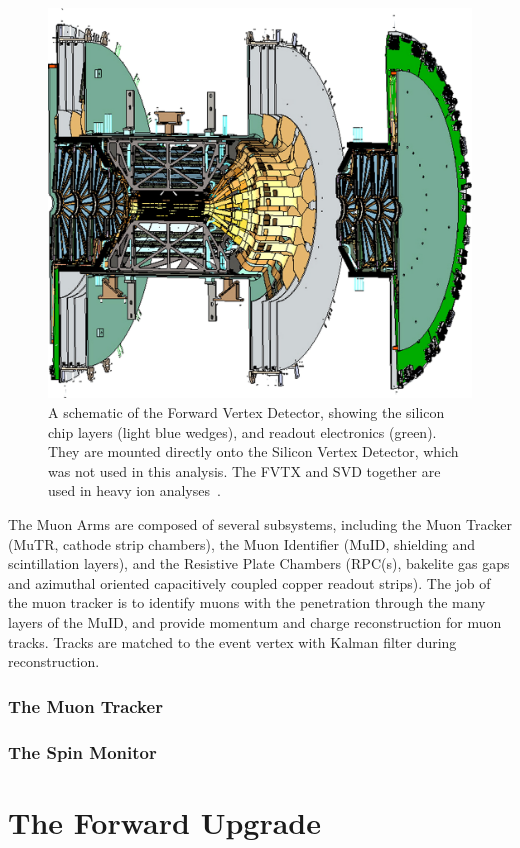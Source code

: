 \begin{figure}[ht]
  \centering
  \includegraphics[width=0.6\linewidth]{./figures/forward_vertex_detector}
  \caption{
    A schematic of the Forward Vertex Detector, showing the silicon chip layers
    (light blue wedges), and readout electronics (green). They are mounted
    directly onto the Silicon Vertex Detector, which was not used in this
    analysis. The FVTX and SVD together are used in heavy ion
    analyses~\cite{Aidala2014}.
  }
  \label{fig:forward_vertex_detector}
\end{figure}

The Muon Arms are composed of several subsystems, including the Muon Tracker
(MuTR, cathode strip chambers), the Muon Identifier (MuID, shielding and
scintillation layers), and the Resistive Plate Chambers (RPC(s), bakelite gas
gaps and azimuthal oriented capacitively coupled copper readout strips). The job
of the muon tracker is to identify muons with the penetration through the many
layers of the MuID, and provide momentum and charge reconstruction for muon
tracks. Tracks are matched to the event vertex with Kalman filter during
reconstruction.

\subsubsection{The Muon Tracker}
\subsubsection{}
\subsubsection{The Spin Monitor}
\section{The Forward Upgrade} 
\label{sec:forward_upgrade}

